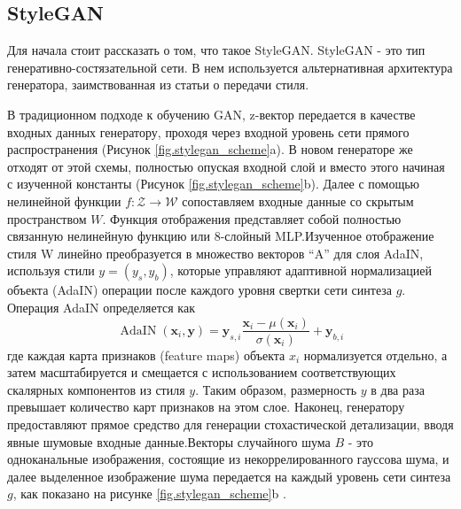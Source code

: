 \subsection{StyleGAN}
Для начала стоит рассказать о том, что такое StyleGAN. StyleGAN - это тип генеративно-состязательной сети. В нем используется альтернативная архитектура генератора, заимствованная из статьи о передачи стиля. \cite{styletransfer}

В традиционном подходе к обучению GAN, z-вектор передается в качестве входных данных генератору, проходя через входной уровень сети прямого распространения (Рисунок {\color{blue} \ref{fig.stylegan_scheme}a}). В новом генераторе же отходят от этой схемы, полностью опуская входной слой и вместо этого начиная с изученной константы (Рисунок {\color{blue} \ref{fig.stylegan_scheme}b}). Далее с помощью нелинейной функции $f : \mathcal{Z} \rightarrow \mathcal{W}$ сопоставляем входные данные со скрытым пространством $W$. Функция отображения представляет собой полностью связанную нелинейную функцию или 8-слойный MLP.Изученное отображение стиля W линейно преобразуется в множество векторов “A” для слоя AdaIN, используя стили $y = (y_s, y_b)$, которые управляют адаптивной нормализацией объекта (AdaIN) операции после каждого уровня свертки сети синтеза $g$. Операция AdaIN определяется как
\begin{equation}
    \operatorname{AdaIN}\left(\mathbf{x}_{i}, \mathbf{y}\right)=\mathbf{y}_{s, i} \frac{\mathbf{x}_{i}-\mu\left(\mathbf{x}_{i}\right)}{\sigma\left(\mathbf{x}_{i}\right)}+\mathbf{y}_{b, i}
\end{equation}
где каждая карта признаков (feature maps) объекта $x_i$ нормализуется отдельно, а затем масштабируется и смещается с использованием соответствующих скалярных компонентов из стиля $y$. Таким образом, размерность $y$ в два раза превышает количество карт признаков на этом слое. Наконец, генератору предоставляют прямое средство для генерации стохастической детализации, вводя явные шумовые входные данные.Векторы случайного шума $B$ - это одноканальные изображения, состоящие из некоррелированного гауссова шума, и далее выделенное изображение шума передается на каждый уровень сети синтеза $g$, как показано на рисунке {\color{blue} \ref{fig.stylegan_scheme}b} \cite{StyleGAN}.

